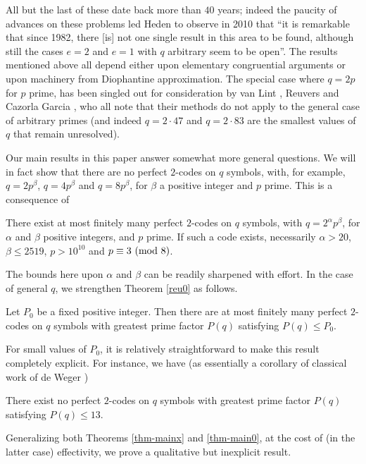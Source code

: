 \documentclass{amsart}
\def\mod#1{{\ifmmode\text{\rm\ (mod~$#1$)}
\else\discretionary{}{}{\hbox{ }}\rm(mod~$#1$)\fi}}
\begin{document}
All but the last of these date back more than $40$ years; indeed the paucity of advances on these problems led Heden \cite{Hed} to observe in 2010 that ``it is remarkable that since 1982, there [is]  not
one single result in this area to be found, although still the cases $e = 2$ and $e = 1$
with $q$ arbitrary seem to be open''.
The results mentioned above all depend either upon elementary congruential arguments or upon machinery from Diophantine approximation. 
The special case where $q=2p$ for $p$ prime, has been singled out for consideration by van Lint \cite{VL1}, Reuvers \cite{Reu} and Cazorla Garcia \cite{CG}, who all note that their methods do not apply to the general case of arbitrary primes (and indeed $q=2 \cdot 47$ and $q =2 \cdot 83$ are the smallest values of $q$ that remain unresolved). 

Our main results in this paper answer somewhat more general questions. We will in fact show that there are no perfect $2$-codes on $q$ symbols, with, for example,  $q=2 p^\beta$, $q=4 p^\beta$ and $q=8 p^\beta$, for  $\beta$  a positive   integer and $p$ prime.
This is a consequence of

\begin{thm} \label{thm-mainx}
There exist at most finitely many  perfect $2$-codes on $q$ symbols, with $q=2^\alpha p^\beta$, for $\alpha$ and $\beta$  positive integers, and $p$ prime. If such a code exists, necessarily   $\alpha > 20$, $\beta \leq 2519$, $p>10^{10}$ and $p \equiv 3 \mod{8}$. 
\end{thm}

The  bounds here  upon $\alpha$ and $\beta$  can be readily sharpened with effort. 
In the case of general $q$, we strengthen Theorem \ref{reu0} as follows.
\begin{thm} \label{thm-main0}
Let $P_0$ be a fixed positive integer. Then there are at most finitely many perfect $2$-codes on $q$ symbols with greatest prime factor $P(q)$ satisfying $P(q) \leq P_0$.
\end{thm}

For small values of $P_0$, it is relatively straightforward to make this result completely explicit. For instance, we have (as essentially a corollary of  classical work of de Weger \cite{dW})
\begin{thm} \label{thm-main1}
There exist no perfect $2$-codes on $q$ symbols with greatest prime factor $P(q)$ satisfying $P(q) \leq 13$.
\end{thm}

Generalizing both Theorems \ref{thm-mainx} and \ref{thm-main0}, at the cost of (in the latter case)  effectivity, we prove a qualitative but inexplicit  result.
 
\end{document}
